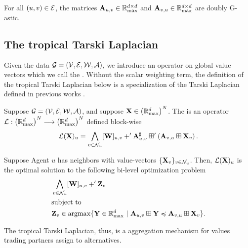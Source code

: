 \documentclass[letterpaper, 10 pt, conference]{ieeeconf}
\begin{document}

\begin{assumption} \label{assume:matrix}
    For all $(u,v) \in \mathcal{E}$, the matrices $\mathbf{A}_{u,v} \in \mathbb{R}_{\mathrm{max}}^{d \times d}$ and $\mathbf{A}_{v,u} \in \mathbb{R}_{\mathrm{max}}^{d \times d}$ are doubly G-astic.
\end{assumption}



\subsection{The tropical Tarski Laplacian}
\label{sec:tarski}

Given the data $\mathcal{G} = (\mathcal{V},\mathcal{E},\mathcal{W},\mathcal{A})$, we introduce an operator on global value vectors which we call the . Without the scalar weighting term, the definition of the tropical Tarski Laplacian below is a specialization of the Tarski Laplacian defined in previous works \cite{riess2022,ghrist2022,riess2022b}. 

\begin{definition} \label{def:tarski}
    Suppose $\mathcal{G} = (\mathcal{V},\mathcal{E},\mathcal{W},\mathcal{A})$, and suppose $\mathbf{X} \in \left(\mathbb{R}_{\mathrm{max}}^d \right)^N$.
    The  is an operator $\mathcal{L} : \left(\mathbb{R}_{\mathrm{max}}^{d}\right)^N \longrightarrow \left(\mathbb{R}_{\mathrm{max}}^{d}\right)^N$ defined block-wise
    \begin{align}
        \mathcal{L}(\mathbf{X})_u = \bigwedge_{v \in \mathcal{N}_u} [\mathbf{W}]_{u,v} +' {\mathbf{A}}^{\sharp}_{u,v} \boxplus' \left( \mathbf{A}_{v,u} \boxplus \mathbf{X}_v \right). \label{eq:tarski}
    \end{align}
\end{definition}


\begin{proposition} \label{prop:opt}
Suppose Agent $u$ has neighbors with value-vectors $\{\mathbf{X}_v \}_{v \in \mathcal{N}_u}$. Then, $\mathcal{L}(\mathbf{X})_u$ is the optimal solution to the following bi-level optimization problem
   \begin{align*}
    & \bigwedge_{v \in \mathcal{N}_u} [\mathbf{W}]_{u,v} +' \mathbf{Z}_v \\
    & \text{subject to} \\
    & \mathbf{Z}_v \in \mathrm{argmax} \{ \mathbf{Y} \in \mathbb{R}_{\mathrm{max}}^d~\vert~\mathbf{A}_{u,v} \boxplus \mathbf{Y} \preccurlyeq \mathbf{A}_{v,u} \boxplus \mathbf{X}_v \}.
    \end{align*}
\end{proposition}
The tropical Tarski Laplacian, thus, is a aggregation mechanism for values trading partners assign to alternatives.  
\end{document}
